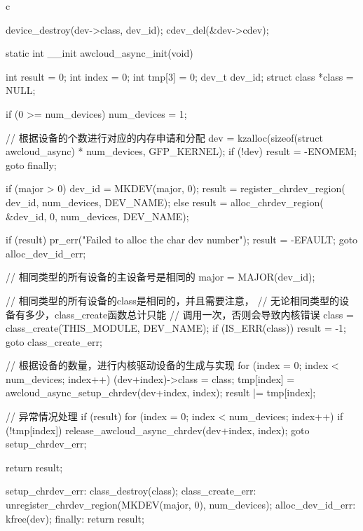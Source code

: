 \begin{code-block}{c}
{{{        device_destroy(dev->class, dev_id);
        cdev_del(&dev->cdev);
}

static int __init awcloud_async_init(void)
{
        int result = 0;
        int index = 0;
        int tmp[3] = {0};
        dev_t dev_id;
        struct class *class = NULL;

        if (0 >= num_devices) {
                num_devices = 1;
        }

        // 根据设备的个数进行对应的内存申请和分配
        dev = kzalloc(sizeof(struct awcloud_async) * num_devices, GFP_KERNEL);
        if (!dev) {
                result = -ENOMEM;
                goto finally;
        }

        if (major > 0) {
                dev_id = MKDEV(major, 0);
                result = register_chrdev_region(
                        dev_id, num_devices, DEV_NAME);
        } else {
                result = alloc_chrdev_region(
                        &dev_id, 0, num_devices, DEV_NAME);
        }

        if (result) {
                pr_err("Failed to alloc the char dev number\n");
                result = -EFAULT;
                goto alloc_dev_id_err;
        }

        // 相同类型的所有设备的主设备号是相同的
        major = MAJOR(dev_id);

        // 相同类型的所有设备的class是相同的，并且需要注意，
        // 无论相同类型的设备有多少，class_create函数总计只能
        // 调用一次，否则会导致内核错误
        class = class_create(THIS_MODULE, DEV_NAME);
        if (IS_ERR(class)) {
                result = -1;
                goto class_create_err;
        }

        // 根据设备的数量，进行内核驱动设备的生成与实现
        for (index = 0; index < num_devices; index++) {
                (dev+index)->class = class;
                tmp[index] = awcloud_async_setup_chrdev(dev+index, index);
                result |= tmp[index];
        }

        // 异常情况处理
        if (result) {
                for (index = 0; index < num_devices; index++) {
                        if (!tmp[index]) {
                                release_awcloud_async_chrdev(dev+index, index);
                        }
                }
                goto setup_chrdev_err;
        }

        return result;

setup_chrdev_err:
        class_destroy(class);
class_create_err:
        unregister_chrdev_region(MKDEV(major, 0), num_devices);
alloc_dev_id_err:
        kfree(dev);
finally:
        return result;
}

}}
\end{code-block}
